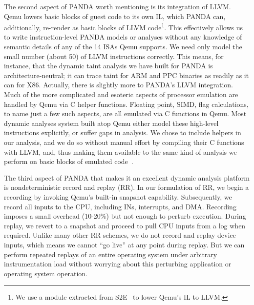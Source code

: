 The second aspect of PANDA worth mentioning is its integration of LLVM.
Qemu lowers basic blocks of guest code to its own IL, which PANDA can, additionally, re-render as basic blocks of LLVM code\footnote{We use a module extracted from S2E~\cite{Chipounov:2011s2e} to lower Qemu's IL to LLVM.}.
This effectively allows us to write instruction-level PANDA models or analyses without any knowledge of semantic details of any of the 14 ISAs Qemu supports.
We need only model the small number (about 50) of LLVM instructions correctly.
This means, for instance, that the dynamic taint analysis we have built for PANDA is architecture-neutral; it can trace taint for ARM and PPC binaries as readily as it can for X86.
Actually, there is slightly more to PANDA's LLVM integration. 
Much of the more complicated and esoteric aspects of processor emulation are handled by Qemu via C helper functions.
Floating point, SIMD, flag calculations, to name just a few such aspects, are all emulated via C functions in Qemu.
Most dynamic analyses system built atop Qemu either model these high-level instructions explicitly, or suffer gaps in analysis. 
We chose to include helpers in our analysis, and we do so without manual effort by compiling their C functions with LLVM, and, thus making them available to the same kind of analysis we perform on basic blocks of emulated code~\cite{Whelan:2013architecture}.

The third aspect of PANDA that makes it an excellent dynamic analysis platform is nondeterministic record and replay (RR).  
In our formulation of RR, we begin a recording by invoking Qemu's built-in snapshot capability.
Subsequently, we record all inputs to the CPU, including INs, interrupts, and DMA.
Recording imposes a small overhead (10-20\%) but not enough to perturb execution.
During replay, we revert to a snapshot and proceed to pull CPU inputs from a log when required.
Unlike many other RR schemes, we do not record and replay device inputs, which means we cannot ``go live'' at any point during replay.
But we can perform repeated replays of an entire operating system under arbitrary instrumentation load without worrying about this perturbing application or operating system operation.  
